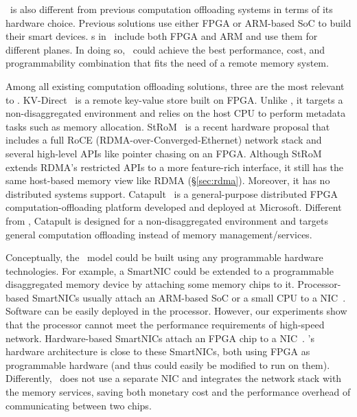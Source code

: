 \fi


\sys\ is also different from previous computation offloading systems in terms of its hardware choice.
Previous solutions use either FPGA or ARM-based SoC to build their smart devices.
\MN{}s in \sys\ include both FPGA and ARM 
and use them for different planes. %
In doing so, \sys\ could achieve the best performance, cost, and programmability
combination that fits the need of a remote memory system.
\fi

Among all existing computation offloading solutions, three are the most relevant to \sys. 
KV-Direct~\cite{KVDIRECT} is a remote key-value store built on FPGA.
Unlike \sys, it targets a non-disaggregated environment and 
relies on the host CPU to perform metadata tasks such as memory allocation.
StRoM~\cite{StRoM} is a recent hardware proposal that includes a full RoCE (RDMA-over-Converged-Ethernet) network stack
and several high-level APIs like pointer chasing on an FPGA.
Although StRoM extends RDMA's restricted APIs to a more feature-rich interface,
it still has the same host-based memory view like RDMA (\S\ref{sec:rdma}).
Moreover, it has no distributed systems support.
Catapult~\cite{Catapult,CatapultV1} is a general-purpose distributed FPGA computation-offloading platform developed and deployed at Microsoft.
Different from \sys, Catapult is designed for a non-disaggregated environment 
and targets general computation offloading instead of memory management/services.
\fi


Conceptually, the \phdm\ model could be built using any programmable hardware technologies.
For example, a SmartNIC could be extended to a programmable disaggregated memory device by attaching some memory chips to it.
Processor-based SmartNICs usually attach an ARM-based SoC or a small CPU to a NIC~\cite{BLUEFIELD,BROADCOM-SMARTNIC}.
Software can be easily deployed in the processor.
However, our experiments show that the processor cannot meet the performance requirements of high-speed network.
Hardware-based SmartNICs attach an FPGA chip to a NIC~\cite{INNOVA,SOLARFLARE-FPGA}.
\sys's hardware architecture is close to these SmartNICs, both using FPGA as programmable hardware (and thus could easily be modified to run on them).
Differently, \sys\ does not use a separate NIC and integrates the network stack with the memory services, 
saving both monetary cost and the performance overhead of communicating between two chips.
\fi

